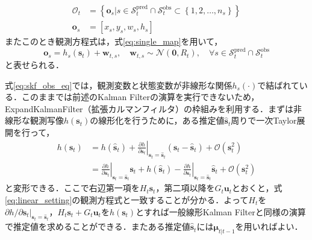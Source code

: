 \begin{equation}
    \label{eq:skf_obs}
    \begin{aligned}
        \mathcal{O}_t &= \left\{\left.\bm{o}_s\right| s \in \mathcal{S}_t^{\text{pred}} \cap \mathcal{S}_t^{\text{obs}} \subset \left\{1,2,\dots,n_s\right\} \right\}
        \\ \bm{o}_s &= \left[x_s, y_s, w_s, h_s\right]
    \end{aligned}    
\end{equation}
またこのとき観測方程式は，式\ref{eq:single_map}を用いて，
\begin{equation}
    \label{eq:skf_obs_eq}
    \bm{o}_s = h_s(\bm{s}_t) + \bm{w}_{t,s}, \quad \bm{w}_{t,s} \sim \mathcal{N}(\bm{0}, R_{t}),\quad \forall s \in \mathcal{S}_t^{\text{pred}} \cap \mathcal{S}_t^{\text{obs}}
\end{equation}
と表せられる．
\par
式\ref{eq:skf_obs_eq}では，観測変数と状態変数が非線形な関係$h_s(\cdot)$で結ばれている．このままでは前述のKalman Filterの演算を実行できないため，ExpandKalmanFilter（拡張カルマンフィルタ）の枠組みを利用する．まずは非線形な観測写像$h(\bm{s}_t)$の線形化を行うために，ある推定値$\hat{\bm{s}}_t$周りで一次Taylor展開を行って，
\begin{equation}
    \begin{aligned}
        h(\bm{s}_t) &= h(\hat{\bm{s}}_t) + \left.\frac{\partial h}{\partial \bm{s}_t}\right|_{\bm{s}_t=\hat{\bm{s}}_t} \left(\bm{s}_t - \hat{\bm{s}}_t\right) + \mathcal{O}(\bm{s}_t^2)
        \\ &= \left.\frac{\partial h}{\partial \bm{s}_t}\right|_{\bm{s}_t=\hat{\bm{s}}_t} \bm{s}_t + h(\hat{\bm{s}}_t) - \left.\frac{\partial h}{\partial \bm{s}_t}\right|_{\bm{s}_t=\hat{\bm{s}}_t} \hat{\bm{s}}_t + \mathcal{O}(\bm{s}_t^2)
    \end{aligned}
\end{equation}
と変形できる．ここで右辺第一項を$H_t \bm{s}_t$，第二項以降を$G_t \bm{u}_t$とおくと，式\ref{eq:linear_setting}の観測方程式と一致することが分かる．よって$H_t$を$\left.\partial h / \partial \bm{s}_t\right|_{\bm{s}_t=\hat{\bm{s}}_t}$，$H_t \bm{s}_t + G_t \bm{u}_t$を$h(\bm{s}_t)$とすれば一般線形Kalman Filterと同様の演算で推定値を求めることができる．またある推定値$\hat{\bm{s}}_t$には$\bm{\mu}_{t|t-1}$を用いればよい．

